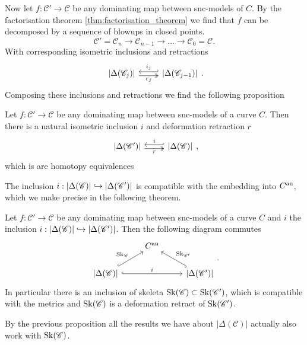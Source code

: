 Now let $f:\mathscr C' \to \mathscr C$ be any dominating map between snc-models of $C$. 
By the factorisation theorem \cref{thm:factorisation_theorem} we find that $f$ can be decomposed by a sequence of blowups in closed points. 
\[
\mathscr C' = \mathscr C_n \to \mathscr C_{n-1} \to \ldots \to \mathscr C_0 = \mathscr C
.\] 
With corresponding isometric inclusions and retractions 
\[
\begin{tikzcd}
	{|\Delta(\mathscr C_{j})|} \rar[hookleftarrow, shift left]{i_j} \rar[twoheadrightarrow, shift right, ']{r_j} & {|\Delta(\mathscr C_{j-1})|} 
\end{tikzcd}
.\] 
Composing these inclusions and retractions we find the following proposition
\begin{proposition}\label{prop:inclusion_retraction_dual_graph}
	Let $f:\mathscr C' \to \mathscr C$ be any dominating map between snc-models of a curve $C$. 
	Then there is a natural isometric inclusion $i$ and deformation retraction $r$
\[
\begin{tikzcd}
	{|\Delta(\mathscr C')|} \rar[hookleftarrow, shift left]{i} \rar[twoheadrightarrow, shift right, ']{r} & {|\Delta(\mathscr C)|} 
\end{tikzcd}
,\] 
	which is are homotopy equivalences
\end{proposition}

The inclusion $i: |\Delta(\mathscr C)| \hookrightarrow |\Delta(\mathscr C')|$ is compatible with the embedding into $C{}^{\text{an}}$, which we make precise in the following theorem. 
\begin{proposition}
	Let $f:\mathscr C' \to \mathscr C$ be any dominating map between snc-models of a curve $C$ and $i$ the inclusion $i: |\Delta(\mathscr C)| \hookrightarrow |\Delta(\mathscr C')|$. 
	Then the following diagram commutes \[
	\begin{tikzcd}
		& C\an \\
		{|\Delta(\mathscr C)|} \ar[hookrightarrow]{ur}{\sk_{\mathscr C}}
\ar[hookrightarrow]{rr}{i} & & {|\Delta(\mathscr C')|} \ar[hookrightarrow]{ul}[']{\sk_{\mathscr C'}}
	\end{tikzcd}
	.\] 
	In particular there is an inclusion of skeleta $\operatorname{Sk}(\mathscr C) \subset  \operatorname{Sk}(\mathscr C')$, which is compatible with the metrics and $\operatorname{Sk}(\mathscr C)$ is a deformation retract of  $\operatorname{Sk}(\mathscr C')$. 
\end{proposition}

By the previous proposition all the results we have about $|\Delta(\mathscr C)|$ actually also work with  $\operatorname{Sk}(\mathscr C)$. 

